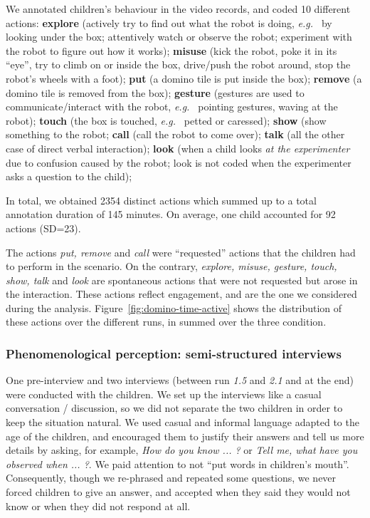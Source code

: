 \documentclass{sig-alternate}
\newcommand{\eg}{{\textit{e.g.~}}}
\begin{document}
We annotated children's behaviour in the video records, and coded 10 different
actions: \textbf{explore} (actively try to find out what the robot is doing, \eg
by looking under the box; attentively watch or observe the robot; experiment
with the robot to figure out how it works); \textbf{misuse} (kick the robot,
poke it in its ``eye'', try to climb on or inside the box, drive/push the robot
around, stop the robot's wheels with a foot); \textbf{put} (a domino tile is put
inside the box); \textbf{remove} (a domino tile is removed from the box);
\textbf{gesture} (gestures are used to communicate/interact with the robot, \eg
pointing gestures, waving at the robot); \textbf{touch} (the box is touched, \eg
petted or caressed); \textbf{show} (show something to the robot; \textbf{call}
(call the robot to come over); \textbf{talk} (all the other case of direct
verbal interaction); \textbf{look} (when a child looks \emph{at the
experimenter} due to confusion caused by the robot; look is not coded when the
experimenter asks a question to the child);


In total, we obtained 2354 distinct actions which summed up to a total
annotation duration of 145 minutes. On average, one child accounted for 92
actions (SD=23).

The actions \textit{put, remove} and \textit{call} were ``requested'' actions
that the children had to perform in the scenario. On the contrary,
\textit{explore, misuse, gesture, touch, show, talk} and \textit{look} are
spontaneous actions that were not requested but arose in the interaction.  These
actions reflect engagement, and are the one we considered during the analysis.
Figure~\ref{fig:domino-time-active} shows the distribution of these actions over
the different runs, in summed over the three condition.

\subsubsection{Phenomenological perception: semi-structured interviews}

One pre-interview and two interviews (between run \emph{1.5} and \emph{2.1} and
at the end) were conducted with the children.  We set up the interviews like a
casual conversation / discussion, so we did not separate the two children in
order to keep the situation natural. We used casual and informal language
adapted to the age of the children, and encouraged them to justify their answers
and tell us more details by asking, for example, \textit{How do you know ... ?}
or \textit{Tell me, what have you observed when ... ?}. We paid attention to not
``put words in children's mouth''. Consequently, though we re-phrased and
repeated some questions, we never forced children to give an answer, and
accepted when they said they would not know or when they did not respond at all.	
\end{document}
